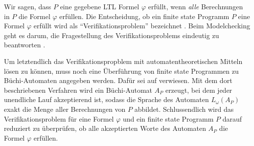 Wir sagen, dass $P$ eine gegebene LTL Formel $\varphi$ erfüllt, wenn \textit{alle} Berechnungen in $P$ die Formel $\varphi$ erfüllen. Die Entscheidung, ob ein finite state Programm $P$ eine Formel $\varphi$ erfüllt wird als "`Verifikationsproblem"' bezeichnet \cite{vardi+96}. Beim Modelchecking geht es darum, die Fragestellung des Verifikationsproblems eindeutig zu beantworten \cite{huth+04,vardi+96}.

Um letztendlich das Verifikationspropblem mit automatentheoretischen Mitteln lösen zu können, muss noch eine Überführung von finite state Programmen zu Büchi-Automaten angegeben werden. Dafür sei auf \cite[kap. 4.2]{vardi+96} verwiesen. Mit dem dort beschriebenen Verfahren wird ein Büchi-Automat $A_P$ erzeugt, bei dem jeder unendliche Lauf akzeptierend ist, sodass die Sprache des Automaten $L_\omega(A_P)$ exakt die Menge aller Berechnungen von $P$ abbildet. Schlussendlich wird das Verifikationsproblem für eine Formel $\varphi$ und ein finite state Programm $P$ darauf reduziert zu überprüfen, ob alle akzeptierten Worte des Automaten $A_P$ die Formel $\varphi$ erfüllen.